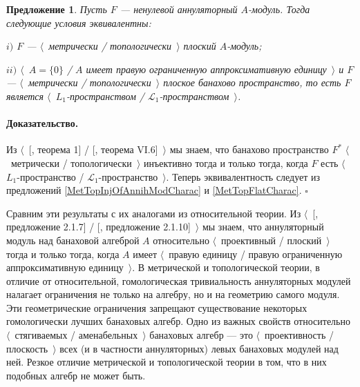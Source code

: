 \documentclass[12pt]{article}
\newtheorem{proposition}[theorem]{Предложение}
\renewenvironment{proof}{\paragraph{Доказательство.}}{\hfill$\square$\medskip}
\begin{document}
\begin{proposition}\label{MetTopFlatAnnihModCharac} Пусть $F$ --- ненулевой аннуляторный $A$-модуль. Тогда следующие условия эквивалентны:

$i)$ $F$ --- $\langle$~метрически / топологически~$\rangle$ плоский $A$-модуль;

$ii)$ $\langle$~$A=\{0\}$ / $A$ имеет правую ограниченную аппроксимативную единицу~$\rangle$ и $F$ --- $\langle$~метрически / топологически~$\rangle$ плоское банахово пространство, то есть $F$ является $\langle$~$L_1$-пространством / $\mathscr{L}_1$-пространством~$\rangle$.
\end{proposition}
\begin{proof} Из $\langle$~[\cite{GrothMetrProjFlatBanSp}, теорема 1] / [\cite{StegRethNucOpL1LInfSp}, теорема VI.6]~$\rangle$ мы знаем, что банахово пространство $F^*$ $\langle$~метрически / топологически~$\rangle$ инъективно тогда и только тогда, когда $F$ есть $\langle$~$L_1$-пространство / $\mathscr{L}_1$-пространство~$\rangle$. Теперь эквивалентность следует из предложений \ref{MetTopInjOfAnnihModCharac} и \ref{MetTopFlatCharac}.
\end{proof}

Сравним эти результаты с их аналогами из относительной теории. Из $\langle$~[\cite{RamsHomPropSemgroupAlg}, предложение 2.1.7] / [\cite{RamsHomPropSemgroupAlg}, предложение 2.1.10]~$\rangle$ мы знаем, что аннуляторный модуль над банаховой алгеброй $A$  относительно $\langle$~проективный / плоский~$\rangle$ тогда и только тогда, когда $A$ имеет  $\langle$~правую единицу / правую ограниченную аппроксимативную единицу~$\rangle$. В метрической и топологической теории, в отличие от относительной, гомологическая тривиальность аннуляторных модулей налагает ограничения не только на алгебру, но и на геометрию самого модуля. Эти геометрические ограничения запрещают существование некоторых гомологически лучших банаховых алгебр. Одно из важных свойств относительно $\langle$~стягиваемых / аменабельных~$\rangle$ банаховых алгебр --- это $\langle$~проективность / плоскость~$\rangle$ всех (и в частности аннуляторных) левых банаховых модулей над ней. Резкое отличие метрической и топологической теории в том, что в них подобных алгебр не может быть.
\end{document}
